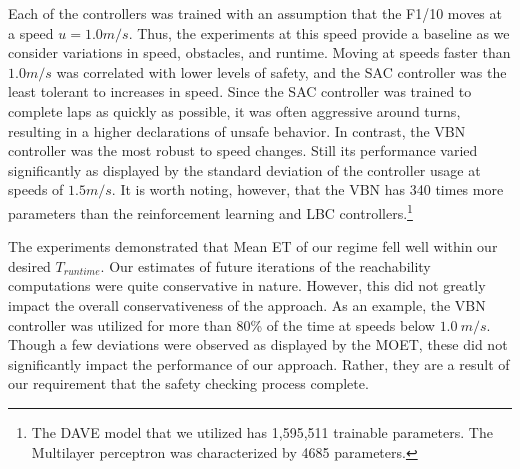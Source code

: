 \documentclass[manuscript,screen,review]{acmart}
\newcommand{\nate}[1]{\textcolor{magenta}{\textbf{\underline{Nate:}} #1}}
\begin{document}
Each of the controllers was trained with an assumption that the F1/10 moves at a speed $u=1.0 m/s$. Thus, the experiments at this speed provide a baseline as we consider variations in speed, obstacles, and runtime. Moving at speeds faster than $1.0 m/s$ was correlated with lower levels of safety, and the SAC controller was the least tolerant to increases in speed. Since the SAC controller was trained to complete laps as quickly as possible, it was often aggressive around turns, resulting in a higher declarations of unsafe behavior. In contrast, the VBN controller was the most robust to speed changes. Still its performance varied significantly as displayed by the standard deviation of the controller usage at speeds of $1.5 m/s$. It is worth noting, however, that the VBN has 340 times more parameters than the reinforcement learning and LBC controllers.\footnote{The DAVE model that we utilized has 1,595,511 trainable parameters. The Multilayer perceptron was characterized by 4685 parameters.}



The experiments demonstrated that Mean ET of our regime fell well within our desired $T_{runtime}$. Our estimates of future iterations of the reachability computations were quite conservative in nature. However, this did not greatly impact the overall conservativeness of the approach. As an example, the VBN controller was utilized for more than 80\% of the time at speeds below $1.0 \ m/s$. Though a few deviations were observed as displayed by the MOET, these did not significantly impact the performance of our approach. Rather, they are a result of our requirement that the safety checking process complete.


\end{document}
